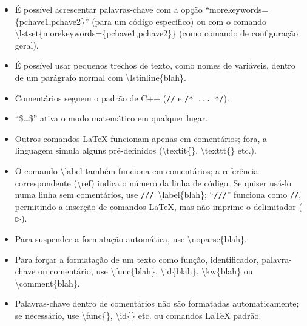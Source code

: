 \begin{itemize}

    \item É possível acrescentar palavras-chave com a opção
          ``\textsf{morekeywords=\{pchave1,\linebreak[0]{}pchave2\}}''
          (para um código específico) ou com o comando
          \textsf{\textbackslash{}lstset\{morekeywords=\linebreak[0]{}\{pchave1,pchave2\}\}}
          (como comando de configuração geral).

    \item É possível usar pequenos trechos de texto, como nomes de variáveis,
          dentro de um parágrafo normal com \textsf{\textbackslash{}lstinline\{blah\}}.

    \item Comentários seguem o padrão de C++ (\lstinline{//} e
          \lstinline{/* ... */}).

    \item ``\$\dots\$'' ativa o modo matemático em qualquer lugar.

    \item Outros comandos LaTeX funcionam apenas em comentários; fora, a
          linguagem simula alguns pré-definidos (\textsf{\textbackslash{}textit\{\}},
          \textsf{\textbackslash{}texttt\{\}} etc.).

    \item O comando \textsf{\textbackslash{}label} também funciona em
          comentários; a referência correspondente (\textsf{\textbackslash{}ref})
          indica o número da linha de código. Se quiser usá-lo numa linha sem
          comentários, use \lstinline{///}~\textsf{\textbackslash{}label\{blah\}};
          ``\lstinline{///}'' funciona como \lstinline{//}, permitindo
          a inserção de comandos \LaTeX{}, mas não imprime o delimitador
          (\ensuremath{\triangleright}).

    \item Para suspender a formatação automática, use \textsf{\textbackslash{}noparse\{blah\}}.

    \item Para forçar a formatação de um texto como função, identificador,
          palavra-chave ou comentário, use \textsf{\textbackslash{}func\{blah\}},
          \textsf{\textbackslash{}id\{blah\}}, \textsf{\textbackslash{}kw\{blah\}} ou
          \textsf{\textbackslash{}comment\{blah\}}.

    \item Palavras-chave dentro de comentários não são formatadas
          automaticamente; se necessário, use \textsf{\textbackslash{}func\{\}},
          \textsf{\textbackslash{}id\{\}} etc. ou comandos \LaTeX{} padrão.


\end{itemize}

